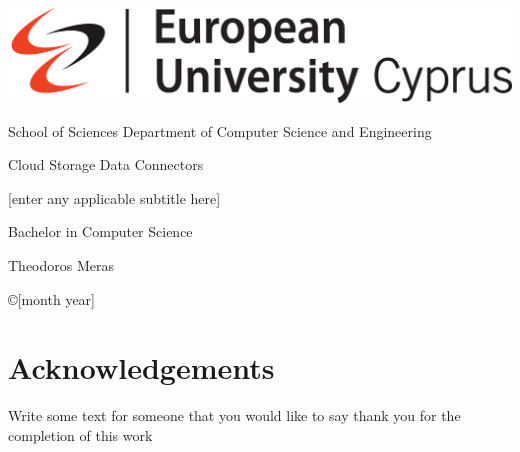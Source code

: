 \documentclass[12pt,a4paper]{report}
\begin{document}
    \thispagestyle{empty}
    {

    \noindent\includegraphics[scale=0.32]{images/euc}


        \begin{center}
            School of Sciences \textbar \; Department of Computer Science and Engineering
        \end{center}

        \vspace{1.5cm}
        \begin{center}
            \Huge  Cloud Storage Data Connectors
        \end{center}


        \vspace{0.2cm}
        \begin{center}
            \Large [enter any applicable subtitle here]
        \end{center}

        \vspace{1.5cm}
        \begin{center}
            \LARGE Bachelor in Computer Science
        \end{center}


        \vspace{1.5cm}
        \begin{center}
            \Large Theodoros Meras
        \end{center}
        \vspace{1.5cm}

        \noindent
        \begin{center}
            \copyright  [month year]
        \end{center}
        \newpage
        \thispagestyle{empty}

    }%

    \section*{Acknowledgements}
    Write some text for someone that you would like to say thank you for the completion of this work
\end{document}
